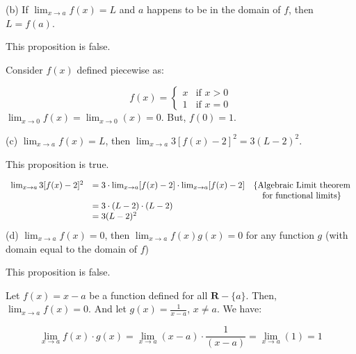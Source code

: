 \documentclass[10pt]{article}
\begin{document}
(b) If $\displaystyle \lim _{x\rightarrow a} f( x) =L$ and $\displaystyle a$ happens to be in the domain of $\displaystyle f$, then $\displaystyle L=f( a)$. 



This proposition is false.



Consider $\displaystyle f( x)$ defined piecewise as:


\begin{equation*}
f( x) =\begin{cases}
x & \text{if } x >0\\
1 & \text{if } x=0
\end{cases}
\end{equation*}
$\displaystyle \lim _{x\rightarrow 0} f( x) =\lim _{x\rightarrow 0}( x) =0$. But, $\displaystyle f( 0) =1$.



(c) $\displaystyle \lim _{x\rightarrow a} f( x) =L$, then $\displaystyle \lim _{x\rightarrow a} 3[ f( x) -2]^{2} =3( L-2)^{2}$. 



This proposition is true.




\begin{equation*}
\begin{array}{ r l c }
\lim _{x\rightarrow a} 3[ f( x) -2]^{2} & =3\cdot \lim _{x\rightarrow a}[ f( x) -2] \cdot \lim _{x\rightarrow a}[ f( x) -2] & \{\text{Algebraic Limit theorem}\\
 &  & \text{for functional limits}\}\\
 & =3\cdot ( L-2) \cdot ( L-2) & \\
 & =3( L-2)^{2} & 
\end{array}
\end{equation*}
(d) $\displaystyle \lim _{x\rightarrow a} f( x) =0$, then $\displaystyle \lim _{x\rightarrow a} f( x) g( x) =0$ for any function $\displaystyle g$ (with domain equal to the domain of $\displaystyle f$)



This proposition is false.



Let $\displaystyle f( x) =x-a$ be a function defined for all $\displaystyle \mathbf{R} -\{a\}$. Then, $\displaystyle \lim _{x\rightarrow a} f( x) =0$. And let $\displaystyle g( x) =\frac{1}{x-a}$, $\displaystyle x\neq a$. We have:


\begin{equation*}
\lim _{x\rightarrow a} f( x) \cdot g( x) =\lim _{x\rightarrow a}( x-a) \cdot \frac{1}{( x-a)} =\lim _{x\rightarrow a}( 1) =1
\end{equation*}
\end{document}
